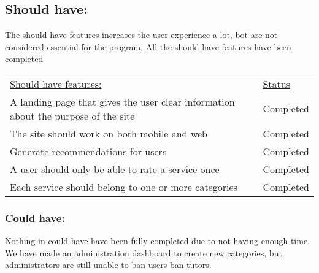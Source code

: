 \subsection{Should have:}
The should have features increases the user experience a lot, bot are not considered essential for the program.
All the should have features have been completed

\begin{table}[h]
    \begin{tabularx}{\textwidth}{|X|l|}
    \underline{Should have features:}                                                                 & \underline{Status} \\
    A landing page that gives the user clear information about the purpose of the site                & Completed \\
    The site should work on both mobile and web                                                       & Completed \\
    Generate recommendations for users                                                                & Completed \\
    A user should only be able to rate a service once                                                 & Completed \\
    Each service should belong to one or more categories                                              & Completed \\
   \end{tabularx}
\end{table}

\subsubsection{Could have:}
Nothing in could have have been fully completed due to not having enough time.
We have made an administration dashboard to create new categories, but administrators are still unable to ban users ban tutors.

